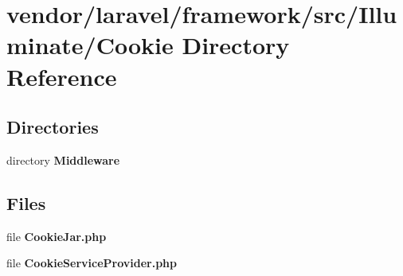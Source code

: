\section{vendor/laravel/framework/src/\+Illuminate/\+Cookie Directory Reference}
\label{dir_6db3c9a3ec114d772813f41779a106c6}
\subsection*{Directories}
\begin{DoxyCompactItemize}
\item 
directory {\bf Middleware}
\end{DoxyCompactItemize}
\subsection*{Files}
\begin{DoxyCompactItemize}
\item 
file {\bf Cookie\+Jar.\+php}
\item 
file {\bf Cookie\+Service\+Provider.\+php}
\end{DoxyCompactItemize}
